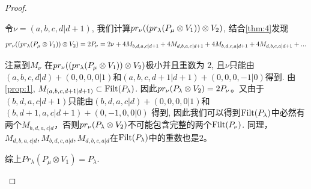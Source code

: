 \begin{proof}
\begin{enumerate}
\begin{enumerate}
令$\nu = (a,b,c,d|d+1)$, 我们计算$pr_\nu ( ( pr_\lambda(P_\mu \otimes V_{1}) ) \otimes V_2 )$, 结合\cref{thm:4}发现
\begin{equation}\notag
  \begin{aligned}
  pr_\nu ( ( pr_\lambda(P_\mu \otimes V_{1}) ) \otimes V_2 ) =
  2P_\nu =2\nu + 4M_{b,d,a,c|d+1} + 4M_{d,b,a,c|d+1} +4M_{b,d,c,a|d+1} + 4M_{d,b,c,a|d+1}+ ...
  \end{aligned}
\end{equation}

注意到$M_\nu$ 在$pr_\nu ( ( pr_\lambda(P_\mu \otimes V_{1}) ) \otimes V_2 )$极小并且重数为 $2$, 且$\nu$只能由$ (a,b,c,d|d) + (0,0,0,0|1)$和$ (a,b,c,d+1|d+1) + (0,0,0,-1|0)$得到.
由\cref{prop:1}, $M_{(a,b,c,d+1|d+1)}\subset \operatorname{Filt}(P_\lambda)$.
因此$pr_\nu(P_\lambda \otimes V_2) = 2P_\nu$。又由于$(b,d,a,c|d+1)$只能由$(b,d,a,c|d) + (0,0,0,0|1)$和$(b,d+1,a,c|d+1) + (0,-1,0,0|0)$ 得到, 因此我们可以得到$\operatorname{Filt}(P_{\lambda})$中必然有两个$M_{b,d,a,c|d}$，否则$pr_\nu(P_\lambda \otimes V_2)$不可能包含完整的两个$\operatorname{Filt}(P_\nu)$. 同理，$M_{d,b,a,c|d},M_{b,d,c,a|d},M_{d,b,c,a|d}$在$\operatorname{Filt}(P_{\lambda})$中的重数也是$2$。

综上$Pr_{\lambda}(P_\mu \otimes V_{1}) = P_\lambda  $.



\end{enumerate}
\end{enumerate}
\end{proof}
